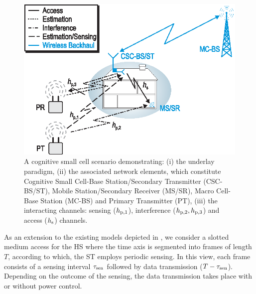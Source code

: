 \begin{figure}[!t]
\centering
\includegraphics[width = \figscalet]{figures/CR_Scenario_Hybrid}
\caption{A cognitive small cell scenario demonstrating: (i) the underlay paradigm, (ii) the associated network elements, which constitute Cognitive Small Cell-Base Station/Secondary Transmitter (CSC-BS/ST), Mobile Station/Secondary Receiver (MS/SR), Macro Cell-Base Station (MC-BS) and Primary Transmitter (PT), (iii) the interacting channels: sensing ($h_{\text{p,1}}$), interference ($h_{\text{p,2}}, h_{\text{p,3}}$) and access ($h_{\text{s}}$) channels.}
\label{fig:scenario}
\vspace{-6mm}
\end{figure}

As an extension to the existing models depicted in \cite{Kang09, Sharma14}, we consider a slotted medium access for the HS where the time axis is segmented into frames of length $T$, according to which, the ST employs periodic sensing. In this view, each frame consists of a sensing interval $\tau_{\text{sen}}$ followed by data transmission ($T - \tau_{\text{sen}}$). Depending on the outcome of the sensing, the data transmission takes place  with or without power control. 

